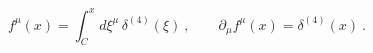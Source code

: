 \begin{equation}
f^{\mu }(x)=\int_{C}^{x}d\xi ^{\mu }\,\delta ^{(4)}(\xi )\ ,\qquad \partial
_{\mu }f^{\mu }(x)=\delta ^{(4)}(x)\ .
\end{equation}%
